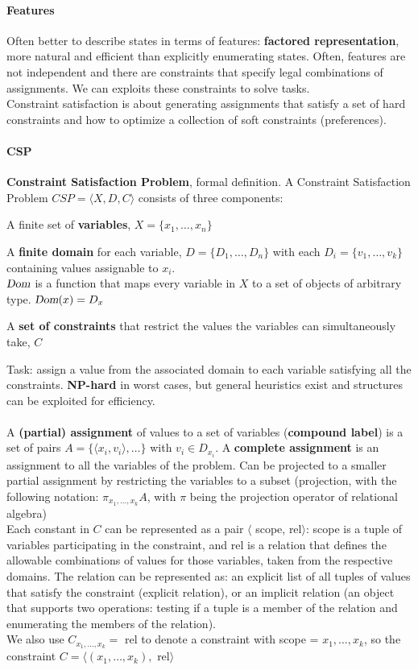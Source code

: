 \documentclass[10pt]{report}
\begin{document}
\paragraph{Features} Often better to describe states in terms of features: \textbf{factored representation}, more natural and efficient than explicitly enumerating states. Often, features are not independent and there are constraints that specify legal combinations of assignments. We can exploits these constraints to solve tasks.\\
Constraint satisfaction is about generating assignments that satisfy a set of hard constraints and how to optimize a collection of soft constraints (preferences).
\paragraph{CSP} \textbf{Constraint Satisfaction Problem}, formal definition.
A Constraint Satisfaction Problem $CSP = \langle X, D, C\rangle$ consists of three components: \begin{list}{}{}
	\item A finite set of \textbf{variables}, $X = \{x_1, \ldots, x_n\}$
	\item A \textbf{finite domain} for each variable, $D = \{D_1, \ldots, D_n\}$ with each $D_i = \{v_1, \ldots, v_k\}$ containing values assignable to $x_i$.\\
	$\textsl{Dom}$ is a function that maps every variable in $X$ to a set of objects of arbitrary type. $\textsl{Dom}(x) = D_x$
	\item A \textbf{set of constraints} that restrict the values the variables can simultaneously take, $C$
\end{list}
Task: assign a value from the associated domain to each variable satisfying all the constraints. \textbf{NP-hard} in worst cases, but general heuristics exist and structures can be exploited for efficiency.\\\\
A \textbf{(partial) assignment} of values to a set of variables (\textbf{compound label}) is a set of pairs $A=\{\langle x_i, v_i\rangle, \ldots\}$ with $v_i \in D_{x_i}$. A \textbf{complete assignment} is an assignment to all the variables of the problem. Can be projected to a smaller partial assignment by restricting the variables to a subset (projection, with the following notation: $\pi_{x_1,\ldots,x_k} A$, with $\pi$ being the projection operator of relational algebra)\\
Each constant in $C$ can be represented as a pair $\langle$ scope, rel$\rangle$: scope is a tuple of variables participating in the constraint, and rel is a relation that defines the allowable combinations of values for those variables, taken from the respective domains. The relation can be represented as: an explicit list of all tuples of values that satisfy the constraint (explicit relation), or an implicit relation (an object that supports two operations: testing if a tuple is a member of the relation and enumerating the members of the relation).\\
We also use $C_{x_1,\ldots,x_k} =$ rel to denote a constraint with scope = $x_1,\ldots,x_k$, so the constraint $C=\langle(x_1,\ldots,x_k),$ rel$\rangle$
\end{document}
